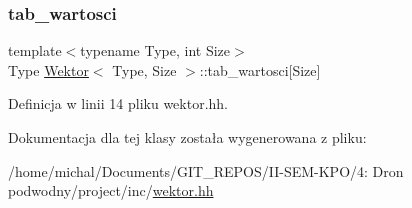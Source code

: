 \subsubsection{\texorpdfstring{tab\+\_\+wartosci}{tab\_wartosci}}
{\footnotesize\ttfamily template$<$typename Type, int Size$>$ \\
Type \hyperlink{class_wektor}{Wektor}$<$ Type, Size $>$\+::tab\+\_\+wartosci\mbox{[}Size\mbox{]}\hspace{0.3cm}{\ttfamily [private]}}



Definicja w linii 14 pliku wektor.\+hh.



Dokumentacja dla tej klasy została wygenerowana z pliku\+:\begin{DoxyCompactItemize}
\item 
/home/michal/\+Documents/\+G\+I\+T\+\_\+\+R\+E\+P\+O\+S/\+I\+I-\/\+S\+E\+M-\/\+K\+P\+O/4\+: Dron podwodny/project/inc/\hyperlink{wektor_8hh}{wektor.\+hh}\end{DoxyCompactItemize}
